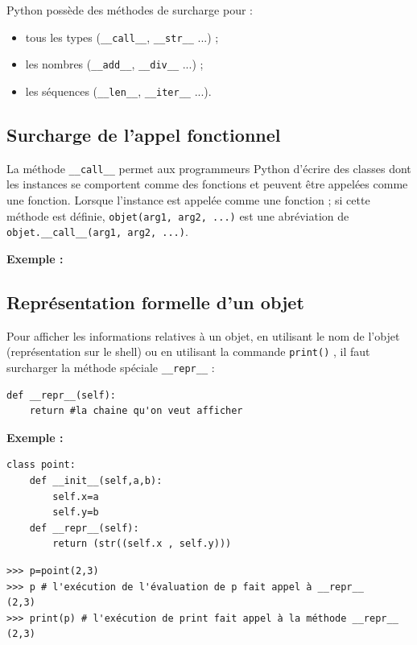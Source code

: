 \documentclass[a4paper,11pt]{article}
\theoremstyle{mytheor}
\begin{document}
Python possède des méthodes de surcharge pour :
\begin{itemize}
\item tous les types (\Verb!__call__!, \Verb!__str__! ...) ;

\item les nombres (\Verb!__add__!, \Verb!__div__! ...) ;

\item les séquences (\Verb!__len__!, \Verb!__iter__! ...).
\end{itemize}


\subsection{Surcharge de l'appel fonctionnel}
La méthode \Verb!__call__! permet aux programmeurs Python d'écrire des classes dont les instances se comportent comme des fonctions et peuvent être appelées comme une fonction. Lorsque l'instance est appelée comme une fonction ; si cette méthode est définie, \texttt{objet(arg1, arg2, ...)} est une abréviation de \Verb!objet.__call__(arg1, arg2, ...)!.

\textbf{Exemple :}



\subsection{Représentation formelle d'un objet}

Pour afficher les informations relatives à un objet, en utilisant le nom de l'objet (représentation sur le shell) ou en utilisant la commande \texttt{print()} , il faut surcharger la méthode spéciale \Verb!__repr__! :
\begin{lstlisting}
def __repr__(self):
	return #la chaine qu'on veut afficher
\end{lstlisting}

\textbf{Exemple :}

\begin{lstlisting}
class point:
	def __init__(self,a,b):
		self.x=a
		self.y=b
	def __repr__(self):
		return (str((self.x , self.y)))
\end{lstlisting}

	
\begin{Verbatim}[frame=leftline, framerule=1.5mm, rulecolor=\color{blue}]
>>> p=point(2,3)
>>> p # l'exécution de l'évaluation de p fait appel à __repr__
(2,3)
>>> print(p) # l'exécution de print fait appel à la méthode __repr__
(2,3)
\end{Verbatim}
\end{document}
